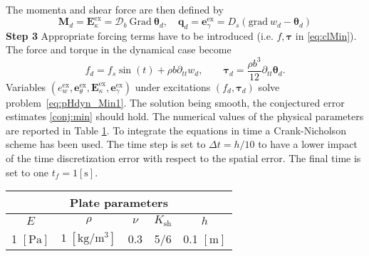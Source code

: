 The momenta and shear force are then defined by
\[
\bm{M}_d = \bm{E}_\kappa^\text{ex} =  \bm{\mathcal{D}}_b \ \mathrm{Grad} \ \bm{\theta}_d, \quad \bm{q}_d = \bm{e}_\gamma^\text{ex} = D_s(\mathrm{grad} \ w_d - \bm{\theta}_d)
\]
\textbf{Step 3 } Appropriate forcing terms have to be introduced (i.e. $f, \bm{\tau}$ in \eqref{eq:clMin}). The force and torque in the dynamical case become
\begin{equation*}
f_d = f_s \sin(t) + \rho b \partial_{tt} w_d, \qquad \bm{\tau}_d = \frac{\rho b^3}{12} \partial_{tt} \bm{\theta}_d.
\end{equation*}
Variables $(e_w^\text{ex}, \bm{e}_\theta^\text{ex}, \bm{E}_\kappa^\text{ex}, \bm{e}_\gamma^\text{ex})$ under excitations $(f_d, \bm{\tau}_d)$ solve problem~\eqref{eq:pHdyn_Min1}. The solution being smooth, the conjectured error estimates \ref{conj:min} should hold. The numerical values of the physical parameters are reported in Table \ref{tab:parMin}.  To integrate the equations in time a Crank-Nicholson scheme has been used. The time step is set to $\Delta t = h/10$ to have a lower impact of the time discretization error with respect to the spatial error. The final time is set to one $t_f = 1 [\textrm{s}]$.

\begin{table}[htb]
	\centering
	\begin{tabular}{ccccc}
		\hline 
		\multicolumn{5}{c}{Plate parameters} \\ 
		\hline 
		$E$ & $\rho$ & $\nu$ & $K_{\text{sh}}$ & $h$ \\
		1 $[\textrm{Pa}]$ & $1\; [\textrm{kg}/\textrm{m}^3]$ & 0.3 & 5/6 & 0.1 $[\textrm{m}]$\\ 
		\hline 
	\end{tabular} 
	\captionsetup{width=0.95\linewidth}
	\vspace{1mm}
	\label{tab:parMin}
\end{table}


